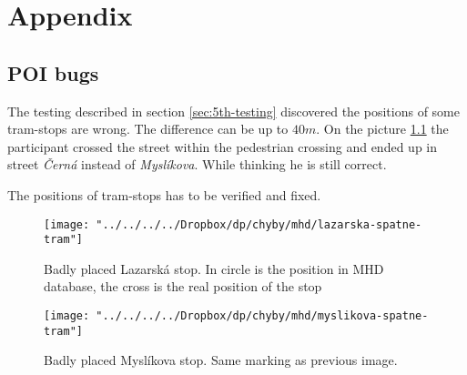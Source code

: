 \documentclass[11pt,oneside,a4paper]{book}
\begin{document}
	
	\chapter{Appendix}
		\section{POI bugs}
			The testing described in section \ref{sec:5th-testing} discovered the positions of some tram-stops are wrong. The difference can be up to $40m$. On the picture \ref{fig:myslikova-spatne-tram} the participant crossed the street within the pedestrian crossing and ended up in street \emph{Černá} instead of \emph{Myslíkova}. While thinking he is still correct.
			
			The positions of tram-stops has to be verified and fixed.
			\begin{figure}[!htb]
				\texttt{[image: "../../../../Dropbox/dp/chyby/mhd/lazarska-spatne-tram"]}
				\caption{Badly placed Lazarská stop. In circle is the position in MHD database, the cross is the real position of the stop}\label{fig:awesome_image1}
				\endminipage\hfill
				\texttt{[image: "../../../../Dropbox/dp/chyby/mhd/myslikova-spatne-tram"]}
				\caption{Badly placed Myslíkova stop. Same marking as previous image.}\label{fig:myslikova-spatne-tram}
				\endminipage\hfill
			\end{figure}
		
		
	
	

	
	
	
	
		
	{
		\def\CS{$\cal C\kern-0.1667em\lower.5ex\hbox{$\cal S$}\kern-0.075em $}
		
	}
	
	
	
\end{document}
